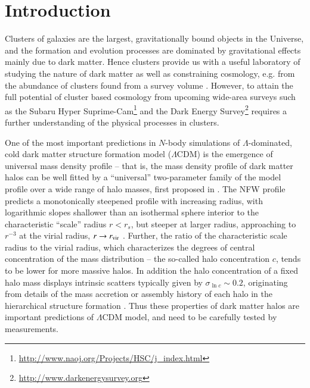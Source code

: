 \documentclass[iop, apj]{emulateapj}
\newcommand{\?}{\stackrel{?}{=}}
\begin{document}


\section{Introduction}

Clusters of galaxies are the largest, gravitationally bound objects in the
Universe, and the formation and evolution processes are dominated by
gravitational effects mainly due to dark matter. Hence clusters provide
us with a useful laboratory of studying the nature of dark matter
\citep{Cloweetal:06} as well as constraining cosmology, e.g. from the
abundance of clusters found from a survey volume
\citep{Vikhlininetal:09,Rozoetal:10,OguriTakada:11}. However, to attain
the full potential of cluster based cosmology from upcoming wide-area
surveys such as the Subaru Hyper
Suprime-Cam\footnote{\url{http://www.naoj.org/Projects/HSC/j\_index.html}}
and the Dark Energy
Survey\footnote{\url{http://www.darkenergysurvey.org}} requires a
further understanding of the physical processes in clusters.

One of the most important predictions in $N$-body simulations of
$\Lambda$-dominated, cold dark matter structure formation model
($\Lambda$CDM) is the emergence of universal mass density profile --
that is, the mass density profile of dark matter halos can be well
fitted by a ``universal'' two-parameter family of the model profile over
a wide range of halo masses, first proposed in \citet[][hereafter
NFW]{NFW:96,NFW:97}.  The NFW profile predicts a monotonically steepened
profile with increasing radius, with logarithmic slopes shallower than
an isothermal sphere interior to the characteristic ``scale'' radius
$r<r_s$, but steeper at larger radius, approaching to $r^{-3}$ at the
virial radius, $r\rightarrow r_{\rm vir}$ \citep[see also][for
discussion on the physical origin within the framework of the
hierarchical $\Lambda$CDM model]{Dalaletal:10}.  Further, the ratio of
the characteristic scale radius to the virial radius, which
characterizes the degrees of central concentration of the mass
distribution -- the so-called halo concentration $c$, tends to be lower
for more massive halos. In addition the halo concentration of a fixed
halo mass displays intrinsic scatters typically given by $\sigma_{\ln
c}\sim 0.2$, originating from details of the mass accretion or assembly
history of each halo in the hierarchical structure formation
\citep{Bullocketal:01,Wechsleretal:02,Zhaoetal:03,Duffyetal:08,Zhaoetal:09,Bhattacharyaetal:13,DiemerKravtsov:14}.
Thus these properties of dark matter halos are important predictions of
$\Lambda$CDM model, and need to be carefully tested by measurements.
\end{document}
